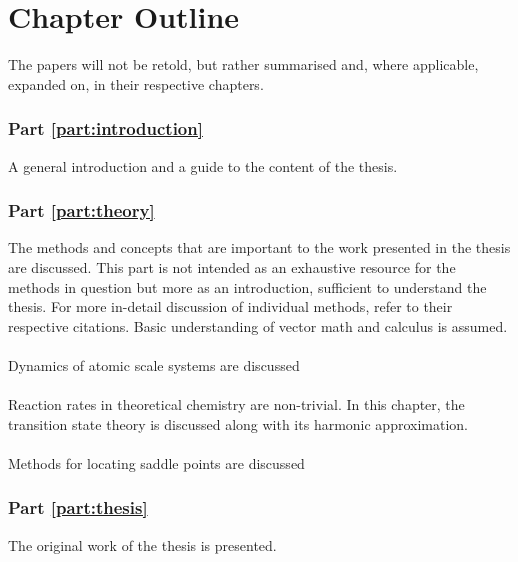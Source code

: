 \section{Chapter Outline}
\label{sec:chapters}

The papers will not be retold, but rather summarised and, where applicable, expanded on, in their respective chapters.

\subsubsection{Part \ref{part:introduction}}
A general introduction and a guide to the content of the thesis.

\subsubsection{Part \ref{part:theory}}
The methods and concepts that are important to the work presented in the thesis are discussed.
This part is not intended as an exhaustive resource for the methods in question but more as an introduction, sufficient to understand the thesis.
For more in-detail discussion of individual methods, refer to their respective citations.
Basic understanding of vector math and calculus is assumed.

\paragraph{}
Dynamics of atomic scale systems are discussed \expand

\paragraph{}
Reaction rates in theoretical chemistry are non-trivial.
In this chapter, the transition state theory is discussed along with its harmonic approximation.
\expand

\paragraph{}
Methods for locating saddle points are discussed \expand

\subsubsection{Part \ref{part:thesis}}
The original work of the thesis is presented.

